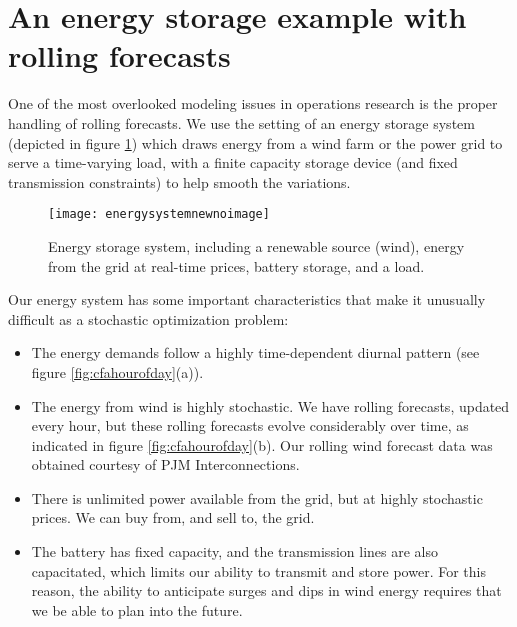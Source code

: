 \documentclass[11pt,oneside,fleqn,reqno,titlepage]{article}
\newcounter{example}
\begin{document}
\begin{comment}
\end{comment}



\section{An energy storage example with rolling forecasts}
\label{sec:cfaenergystorage}
One of the most overlooked modeling issues in operations research is the proper handling of rolling forecasts.  We use the setting of an energy storage system (depicted in figure \ref{fig:energysystemnew}) which draws energy from a wind farm or the power grid to serve a time-varying load, with a finite capacity storage device (and fixed transmission constraints) to help smooth the variations.
\begin{figure}[tb]
\begin{center}
    \texttt{[image: energysystemnewnoimage]}
    \caption{Energy storage system, including a renewable source (wind), energy from the grid at real-time prices, battery storage, and a load.}
    \label{fig:energysystemnew}
\end{center}
\end{figure}

Our energy system has some important characteristics that make it unusually difficult as a stochastic optimization problem:
\begin{itemize}
    \item The energy demands follow a highly time-dependent diurnal pattern (see figure \ref{fig:cfahourofday}(a)).
    \item The energy from wind is highly stochastic.  We have rolling forecasts, updated every hour, but these rolling forecasts evolve considerably over time, as indicated in figure \ref{fig:cfahourofday}(b).  Our rolling wind forecast data was obtained courtesy of PJM Interconnections.
    \item There is unlimited power available from the grid, but at highly stochastic prices.  We can buy from, and sell to, the grid.
    \item The battery has fixed capacity, and the transmission lines are also capacitated, which limits our ability to transmit and store power.  For this reason, the ability to anticipate surges and dips in wind energy requires that we be able to plan into the future.
\end{itemize}
\end{document}
